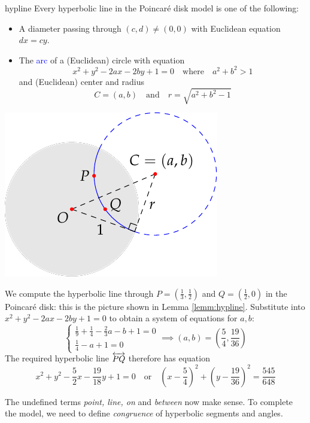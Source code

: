 \begin{lemm}[lower separated=false, sidebyside, sidebyside align=top seam, sidebyside gap=0pt, righthand width=0.37\linewidth]{}{hypline}
	Every hyperbolic line in the Poincaré disk model is one of the following:
	\begin{itemize}
	  \item A diameter passing through $(c,d)\neq (0,0)$ with Euclidean equation $dx=cy$.
	  \item The \textcolor{blue}{arc} of a (Euclidean) circle with equation
		\[
			x^2+y^2-2ax-2by+1=0\quad\text{where}\quad a^2+b^2>1
		\]
		and (Euclidean) center and radius
		\[
			C=(a,b)\quad\text{and}\quad r=\sqrt{a^2+b^2-1}
		\]
	\end{itemize}
	\tcblower
	\flushright\includegraphics[scale=0.95]{models-example}
\end{lemm}

\goodbreak


\begin{example}{}{}
	We compute the hyperbolic line through $P=(\frac 13,\frac 12)$ and $Q=(\frac 12,0)$ in the Poincaré disk: this is the picture shown in Lemma \ref{lemm:hypline}.\smallbreak
	Substitute into $x^2+y^2-2ax-2by+1=0$ to obtain a system of equations for $a,b$:
	\[
		\begin{cases}
			\frac 19+\frac 14-\frac 23a-b+1=0\\
			\frac 14-a+1=0
		\end{cases}
		\implies (a,b)=\left(\frac 54,\frac{19}{36}\right)
	\]
	The required hyperbolic line $\overleftrightarrow{PQ}$ therefore has equation
	\[
		x^2+y^2-\frac 52x-\frac{19}{18}y+1=0
		\quad\text{or}\quad
		\left(x-\frac 54\right)^2+\left(y-\frac{19}{36}\right)^2 =\frac{545}{648}
	\]
\end{example}

The undefined terms \emph{point, line, on} and \emph{between} now make sense. To complete the model, we need to define \emph{congruence} of hyperbolic segments and angles.

